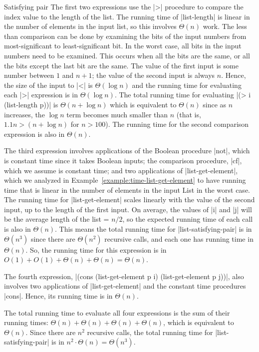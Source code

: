 \begin{schemeregion}
{\begin{example}{Satisfying pair}
The first two expressions use the \scheme|>| procedure to compare the index value to the length of the list.  The running time of \scheme|list-length| is linear in the number of elements in the input list, so this involves $\Theta(n)$ work.  The less than comparison can be done by examining the bits of the input numbers from most-significant to least-significant bit.  In the worst case, all bits in the input numbers need to be examined.  This occurs when all the bits are the same, or all the bits except the last bit are the same.  The value of the first input is some number between $1$ and $n+1$; the value of the second input is always $n$.  Hence, the size of the input to \scheme|<| is $\Theta(\log n)$ and the running time for evaluating each \scheme|>| expression is in $\Theta(\log n)$.  The total running time for evaluating \scheme|(> i (list-length p))| is $\Theta(n + \log n)$ which is equivalent to $\Theta(n)$ since as $n$ increases, the $\log n$ term becomes much smaller than $n$ (that is, $1.1n > (n + \log n)$ for $n > 100$).  The running time for the second comparison expression is also in $\Theta(n)$.  

The third expression involves applications of the Boolean procedure \scheme|not|, which is constant time since it takes Boolean inputs; the comparison procedure, \scheme|cf|, which we assume is constant time; and two applications of \scheme|list-get-element|, which we analyzed in Example~\ref{example:time-list-get-element} to have running time that is linear in the number of elements in the input List in the worst case.  The running time for \scheme|list-get-element| scales linearly with the value of the second input, up to the length of the first input.  On average, the values of \scheme|i| and \scheme|j| will be the average length of the list = $n/2$, so the expected running time of each	 call is also in $\Theta(n)$.  This means the total running time for \scheme|list-satisfying-pair| is in $\Theta(n^3)$ since there are $\Theta(n^2)$ recursive calls, and each one has running time in $\Theta(n)$.  So, the running time for this expression is in $O(1) + O(1) + \Theta(n) + \Theta(n) = \Theta(n)$.

The fourth expression, \scheme|(cons (list-get-element p i) (list-get-element p j))|, also involves two applications of \scheme|list-get-element| and the constant time procedures \scheme|cons|.  Hence, its running time is in $\Theta(n)$.

The total running time to evaluate all four expressions is the sum of their running times: $\Theta(n) + \Theta(n) + \Theta(n) + \Theta(n)$, which is equivalent to $\Theta(n)$.  Since there are $n^2$ recursive calls, the total running time for \scheme|list-satisfying-pair| is in $n^2 \cdot \Theta(n) = \Theta(n^3)$.
\end{example}


}
\end{schemeregion}
